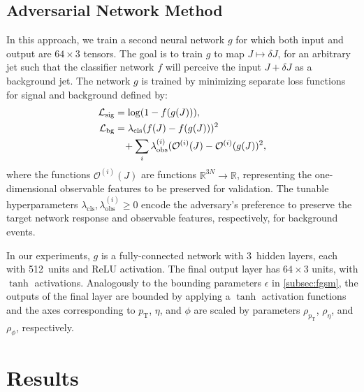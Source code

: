 \documentclass[reprint,nofootinbib,...]{revtex4-1}
\newcommand{\nconst}{64}       %
\newcommand{\nlayerADV}{3}
\newcommand{\nunitsADV}{512}
\newcommand{\pt}{p_\mathrm{T}} %
\begin{document}
\subsection{Adversarial Network Method}
\label{sec:adversarial}

In this approach, we train a second neural network $g$ for which both input and output are $\nconst\times 3$ tensors.
The goal is to train $g$ to map $J\mapsto\delta J$, for an arbitrary jet such that the classifier network $f$ will perceive the input $J+\delta J$ as a background jet.
The network $g$ is trained by minimizing separate loss functions for signal and background defined by:
\begin{align}
\mathcal{L}_\text{sig}&=\log(1-f(g(J))),\\\nonumber
\mathcal{L}_\text{bg}&=\lambda_\mathrm{cls} (f(J)-f(g(J)))^2\\
&\hspace{3mm}+\sum_i \lambda^{(i)}_\mathrm{obs} (\mathcal{O}^{(i)}(J)-\mathcal{O}^{(i)}(g(J))^2,
\end{align}
where the functions $\mathcal{O}^{(i)}(J)$ are functions $\mathbb{R}^{3N}\rightarrow \mathbb{R}$, representing the one-dimensional observable features to be preserved for validation.
The tunable hyperparameters $\lambda_\mathrm{cls}, \lambda^{(i)}_\mathrm{obs} \geq 0$ encode the adversary's preference to preserve the target network response and observable features, respectively, for background events.

In our experiments, $g$ is a fully-connected network with \nlayerADV\ hidden layers, each with \nunitsADV\ units and ReLU activation.
The final output layer has $\nconst\times 3$ units, with $\tanh$ activations.
Analogously to the bounding parameters $\epsilon$ in \ref{subsec:fgsm}, the outputs of the final layer are bounded by applying a $\tanh$ activation functions and the axes corresponding to $\pt$, $\eta$, and $\phi$ are scaled by parameters $\rho_{\pt}$, $\rho_\eta$, and $\rho_\phi$, respectively.


\section{Results}
\label{sec:results}
\end{document}
